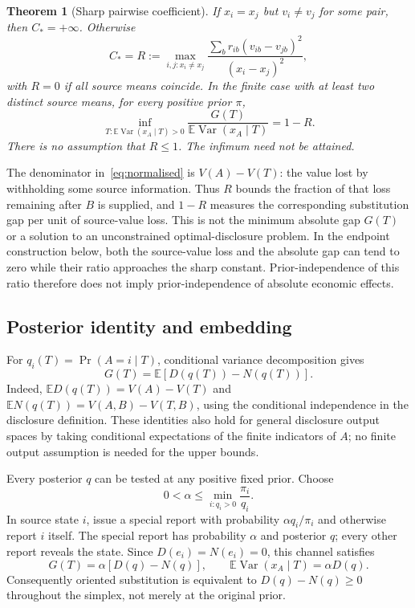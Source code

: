 \documentclass[11pt,a4paper]{article}
\newtheorem{theorem}{Theorem}
\newcommand{\E}{\mathbb E}
\newcommand{\Var}{\operatorname{Var}}
\begin{document}
\begin{theorem}[Sharp pairwise coefficient]\label{thm:sharp}
If $x_i=x_j$ but $v_i\ne v_j$ for some pair, then $C_*=+\infty$. Otherwise
\begin{equation}\label{eq:R}
 C_*=R:=\max_{i,j:x_i\ne x_j}
 \frac{\sum_b r_{ib}(v_{ib}-v_{jb})^2}{(x_i-x_j)^2},
\end{equation}
with $R=0$ if all source means coincide. In the finite case with at least two distinct source means, for every positive prior $\pi$,
\begin{equation}\label{eq:normalised}
 \inf_{T:\E\Var(x_A\mid T)>0}
 \frac{G(T)}{\E\Var(x_A\mid T)}=1-R.
\end{equation}
There is no assumption that $R\leq1$. The infimum need not be attained.
\end{theorem}

The denominator in~\eqref{eq:normalised} is $V(A)-V(T)$: the value lost by withholding some source information. Thus $R$ bounds the fraction of that loss remaining after $B$ is supplied, and $1-R$ measures the corresponding substitution gap per unit of source-value loss. This is not the minimum absolute gap $G(T)$ or a solution to an unconstrained optimal-disclosure problem. In the endpoint construction below, both the source-value loss and the absolute gap can tend to zero while their ratio approaches the sharp constant. Prior-independence of this ratio therefore does not imply prior-independence of absolute economic effects.

\subsection{Posterior identity and embedding}
For $q_i(T)=\Pr(A=i\mid T)$, conditional variance decomposition gives
\begin{equation}\label{eq:identity}
 G(T)=\E[D(q(T))-N(q(T))].
\end{equation}
Indeed, $\E D(q(T))=V(A)-V(T)$ and $\E N(q(T))=V(A,B)-V(T,B)$, using the conditional independence in the disclosure definition. These identities also hold for general disclosure output spaces by taking conditional expectations of the finite indicators of $A$; no finite output assumption is needed for the upper bounds.

Every posterior $q$ can be tested at any positive fixed prior. Choose
\[
 0<\alpha\leq\min_{i:q_i>0}\frac{\pi_i}{q_i}.
\]
In source state $i$, issue a special report with probability $\alpha q_i/\pi_i$ and otherwise report $i$ itself. The special report has probability $\alpha$ and posterior $q$; every other report reveals the state. Since $D(e_i)=N(e_i)=0$, this channel satisfies
\begin{equation}\label{eq:embed}
 G(T)=\alpha[D(q)-N(q)],\qquad
 \E\Var(x_A\mid T)=\alpha D(q).
\end{equation}
Consequently oriented substitution is equivalent to $D(q)-N(q)\geq0$ throughout the simplex, not merely at the original prior.
\end{document}

